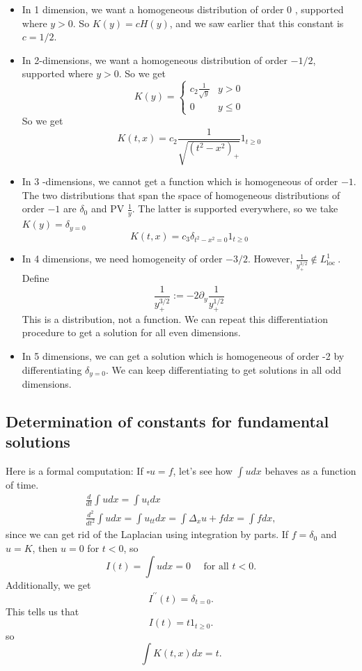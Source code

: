 \begin{itemize}
    \item In 1 dimension, we want a homogeneous distribution of order 0 , supported where $y>0$. So $K(y)=c H(y)$, and we saw earlier that this constant is $c=1 / 2$.
    \item In 2-dimensions, we want a homogeneous distribution of order $-1 / 2$, supported where $y>0 .$ So we get
    $$
    K(y)= \begin{cases}c_{2} \frac{1}{\sqrt{y}} & y>0 \\ 0 & y \leq 0\end{cases}
    $$
    So we get
    $$
    K(t, x)=c_{2} \frac{1}{\sqrt{\left(t^{2}-x^{2}\right)_{+}}} 1_{t \geq 0}
    $$
    \item In 3 -dimensions, we cannot get a function which is homogeneous of order $-1$. The two distributions that span the space of homogeneous distributions of order $-1$ are $\delta_{0}$ and PV $\frac{1}{y}$. The latter is supported everywhere, so we take $K(y)=\delta_{y=0}$
    $$
    K(t, x)=c_{3} \delta_{t^{2}-x^{2}=0} 1_{t \geq 0}
    $$
    \item In 4 dimensions, we need homogeneity of order $-3 / 2$. However, $\frac{1}{y_{+}^{3 / 2}} \notin L_{\text {loc }}^{1}$. Define
    $$
    \frac{1}{y_{+}^{3 / 2}}:=-2 \partial_{y} \frac{1}{y_{+}^{1 / 2}}
    $$
    This is a distribution, not a function. We can repeat this differentiation procedure to get a solution for all even dimensions.
    \item In 5 dimensions, we can get a solution which is homogeneous of order -2 by differentiating $\delta_{y=0}$. We can keep differentiating to get solutions in all odd dimensions.
\end{itemize}


\subsection{Determination of constants for fundamental solutions}
Here is a formal computation: If $\square u=f$, let's see how $\int u d x$ behaves as a function of time.
$$
\begin{gathered}
\frac{d}{d t} \int u d x=\int u_{t} d x \\
\frac{d^{2}}{d t^{2}} \int u d x=\int u_{t t} d x=\int \Delta_x u+f d x=\int f d x,
\end{gathered}
$$
since we can get rid of the Laplacian using integration by parts. If $f=\delta_{0}$ and $u=K$, then $u=0$ for $t<0$, so
$$
I(t)=\int u d x=0 \quad \text { for all } t<0.
$$
Additionally, we get
$$
I^{\prime \prime}(t)=\delta_{t=0}.
$$
This tells us that
$$
I(t)=t 1_{t \geq 0}.
$$
so
$$
\int K(t, x) d x=t.
$$

